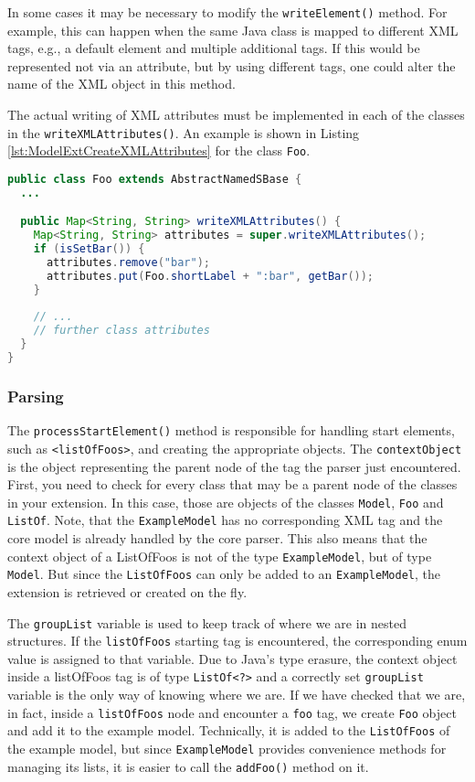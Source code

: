 In some cases it may be necessary to modify the \texttt{writeElement()} method.
For example, this can happen when the same Java class is mapped to different XML tags, e.g., a default element and multiple additional tags.
If this would be represented not via an attribute, but by using different tags, one could alter the name of the XML object in this method.

The actual writing of XML attributes must be implemented in each of the classes in the \texttt{writeXMLAttributes()}.
An example is shown in Listing \ref{lst:ModelExtCreateXMLAttributes} for the class \texttt{Foo}.

\begin{lstlisting}[language=Java,caption={Method to write the XML attributes},label={lst:ModelExtCreateXMLAttributes}]
public class Foo extends AbstractNamedSBase {
  ...

  public Map<String, String> writeXMLAttributes() {
    Map<String, String> attributes = super.writeXMLAttributes();
    if (isSetBar()) {
      attributes.remove("bar");
      attributes.put(Foo.shortLabel + ":bar", getBar());
    }
    
    // ...
    // further class attributes
  }
}
\end{lstlisting}


\subsubsection{Parsing}

The \texttt{processStartElement()} method is responsible for handling start elements, such as \texttt{<listOfFoos>}, and creating the appropriate objects.
The \texttt{contextObject} is the object representing the parent node of the tag the parser just encountered.
First, you need to check for every class that may be a parent node of the classes in your extension.
In this case, those are objects of the classes \texttt{Model}, \texttt{Foo} and \texttt{ListOf}.
Note, that the \texttt{ExampleModel} has no corresponding XML tag and the core model is already handled by the core parser.
This also means that the context object of a ListOfFoos is not of the type \texttt{ExampleModel}, but of type \texttt{Model}.
But since the \texttt{ListOfFoos} can only be added to an \texttt{ExampleModel}, the extension is retrieved or created on the fly.

The \texttt{groupList} variable is used to keep track of where we are in nested structures.
If the \texttt{listOfFoos} starting tag is encountered, the corresponding enum value is assigned to that variable.
Due to Java's type erasure, the context object inside a listOfFoos tag is of type \texttt{ListOf<?>} and a correctly set \texttt{groupList} variable is the only way of knowing where we are.
If we have checked that we are, in fact, inside a \texttt{listOfFoos} node and encounter a \texttt{foo} tag, we create \texttt{Foo} object and add it to the example model.
Technically, it is added to the \texttt{ListOfFoos} of the example model, but since \texttt{ExampleModel} provides convenience methods for managing its lists, it is easier to call the \texttt{addFoo()} method on it.

